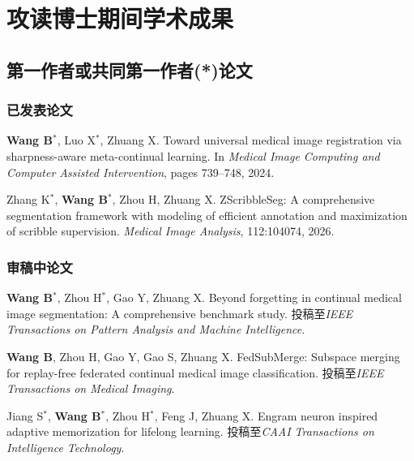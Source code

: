 \chapter*{攻读博士期间学术成果}
\label{back:publications}
\setlength{\emergencystretch}{2em}

\section*{第一作者或共同第一作者(*)论文}

\subsection*{已发表论文}
\begin{enumerate}[leftmargin=2.3em,label={[\arabic*]},itemsep=0.55em,topsep=0.4em]
  \item \textbf{Wang B}$^{*}$, Luo X$^{*}$, Zhuang X. Toward universal medical image registration via sharpness-aware meta-continual learning. In \emph{Medical Image Computing and Computer Assisted Intervention}, pages 739--748, 2024.

  \item Zhang K$^{*}$, \textbf{Wang B}$^{*}$, Zhou H, Zhuang X. ZScribbleSeg: A comprehensive segmentation framework with modeling of efficient annotation and maximization of scribble supervision. \emph{Medical Image Analysis}, 112:104074, 2026.
\end{enumerate}

\subsection*{审稿中论文}
\begin{enumerate}[leftmargin=2.3em,label={[\arabic*]},itemsep=0.55em,topsep=0.4em,resume]
  \item \textbf{Wang B}$^{*}$, Zhou H$^{*}$, Gao Y, Zhuang X. Beyond forgetting in continual medical image segmentation: A comprehensive benchmark study. 投稿至\emph{IEEE Transactions on Pattern Analysis and Machine Intelligence}.

  \item \textbf{Wang B}, Zhou H, Gao Y, Gao S, Zhuang X. FedSubMerge: Subspace merging for replay-free federated continual medical image classification. 投稿至\emph{IEEE Transactions on Medical Imaging}.

  \item Jiang S$^{*}$, \textbf{Wang B}$^{*}$, Zhou H$^{*}$, Feng J, Zhuang X. Engram neuron inspired adaptive memorization for lifelong learning. 投稿至\emph{CAAI Transactions on Intelligence Technology}.
\end{enumerate}


